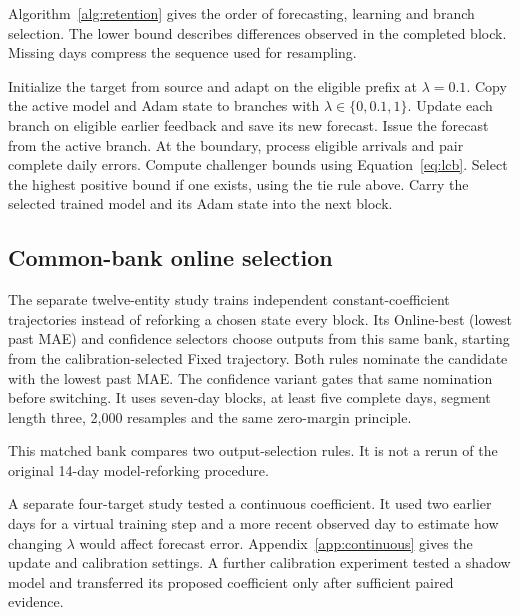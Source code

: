 Algorithm~\ref{alg:retention} gives the order of forecasting, learning and branch selection. The lower bound describes differences observed in the completed block. Missing days compress the sequence used for resampling.

\begin{algorithm}[htbp]
\caption{Retention selection at a target station}\label{alg:retention}
\begin{algorithmic}[1]
\State Initialize the target from source and adapt on the eligible prefix at $\lambda=0.1$.
  \State Copy the active model and Adam state to branches with $\lambda\in\{0,0.1,1\}$.
    \State Update each branch on eligible earlier feedback and save its new forecast.
    \State Issue the forecast from the active branch.
  \EndFor
  \State At the boundary, process eligible arrivals and pair complete daily errors.
    \State Compute challenger bounds using Equation~\eqref{eq:lcb}.
    \State Select the highest positive bound if one exists, using the tie rule above.
  \EndIf
  \State Carry the selected trained model and its Adam state into the next block.
\EndFor
\end{algorithmic}
\end{algorithm}

\subsection{Common-bank online selection}
The separate twelve-entity study trains independent constant-coefficient trajectories instead of reforking a chosen state every block. Its Online-best (lowest past MAE) and confidence selectors choose outputs from this same bank, starting from the calibration-selected Fixed trajectory. Both rules nominate the candidate with the lowest past MAE. The confidence variant gates that same nomination before switching. It uses seven-day blocks, at least five complete days, segment length three, 2,000 resamples and the same zero-margin principle.

This matched bank compares two output-selection rules. It is not a rerun of the original 14-day model-reforking procedure. 

A separate four-target study tested a continuous coefficient. It used two earlier days for a virtual training step and a more recent observed day to estimate how changing $\lambda$ would affect forecast error. Appendix~\ref{app:continuous} gives the update and calibration settings. A further calibration experiment tested a shadow model and transferred its proposed coefficient only after sufficient paired evidence.


